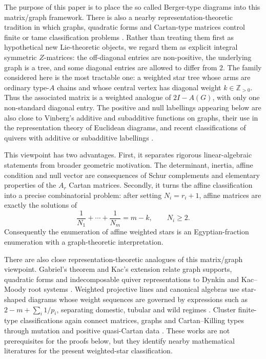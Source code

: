 \documentclass[11pt,a4paper]{article}
\newcommand{\ZZ}{\mathbb Z}
\theoremstyle{definition}
\theoremstyle{plain}
\begin{document}
The purpose of this paper is to place the so called Berger-type diagrams into this matrix/graph framework.  There is also a nearby representation-theoretic tradition in which graphs, quadratic forms and Cartan-type matrices control finite or tame classification problems \citep{Gabriel1972,Kac1980,Ringel1984,GeigleLenzing1987,FominZelevinsky2003,BarotGeissZelevinsky2006}.  Rather than treating them first as hypothetical new Lie-theoretic objects, we regard them as explicit integral symmetric $Z$-matrices: the off-diagonal entries are non-positive, the underlying graph is a tree, and some diagonal entries are allowed to differ from $2$.  The family considered here is the most tractable one: a weighted star tree whose arms are ordinary type-$A$ chains and whose central vertex has diagonal weight $k\in\ZZ_{>0}$.  Thus the associated matrix is a weighted analogue of $2I-A(G)$, with only one non-standard diagonal entry.  The positive and null labellings appearing below are also close to Vinberg's additive and subadditive functions on graphs, their use in the representation theory of Euclidean diagrams, and recent classifications of quivers with additive or subadditive labellings \citep{Vinberg1971,HappelPreiserRingel1980,GalashinPylyavskyy2019,GalashinPylyavskyy2020}.

This viewpoint has two advantages.  First, it separates rigorous linear-algebraic statements from broader geometric motivation.  The determinant, inertia, affine condition and null vector are consequences of Schur complements and elementary properties of the $A_r$ Cartan matrices.  Secondly, it turns the affine classification into a precise combinatorial problem: after setting $N_i=r_i+1$, affine matrices are exactly the solutions of
\begin{equation}
        \frac1{N_1}+\cdots+\frac1{N_m}=m-k,
        \qquad N_i\ge 2.
\label{eq:intro-egyptian}
\end{equation}
Consequently the enumeration of affine weighted stars is an Egyptian-fraction enumeration with a graph-theoretic interpretation.

There are also close representation-theoretic analogues of this matrix/graph viewpoint.  Gabriel's theorem and Kac's extension relate graph supports, quadratic forms and indecomposable quiver representations to Dynkin and Kac--Moody root systems \citep{Gabriel1972,Kac1980}.  Weighted projective lines and canonical algebras use star-shaped diagrams whose weight sequences are governed by expressions such as $2-m+\sum_i 1/p_i$, separating domestic, tubular and wild regimes \citep{Ringel1984,GeigleLenzing1987}.  Cluster finite-type classifications again connect matrices, graphs and Cartan--Killing types through mutation and positive quasi-Cartan data \citep{FominZelevinsky2003,BarotGeissZelevinsky2006}.  These works are not prerequisites for the proofs below, but they identify nearby mathematical literatures for the present weighted-star classification.
\end{document}
